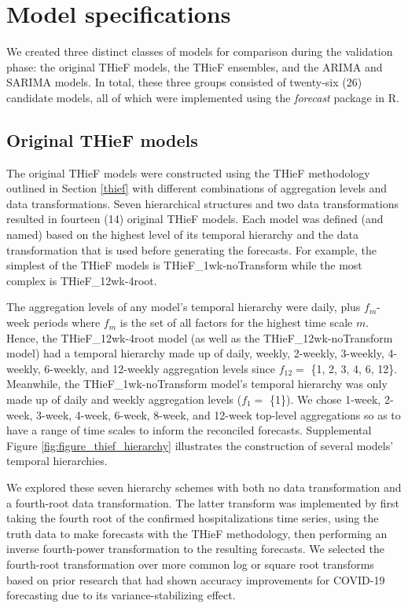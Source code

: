 \documentclass[thesis]{umassthesis}  %
\begin{document}
\section{Model specifications} \label{model_specifications}
We created three distinct classes of models for comparison during the validation phase: the original THieF models, the THieF ensembles, and the ARIMA and SARIMA models. In total, these three groups consisted of twenty-six (26) candidate models, all of which were implemented using the \textit{forecast} package in R.

\subsection{Original THieF models} \label{thief_models}
The original THieF models were constructed using the THieF methodology outlined in Section \ref{thief} with different combinations of aggregation levels and data transformations. Seven hierarchical structures and two data transformations resulted in fourteen (14) original THieF models. Each model was defined (and named) based on the highest level of its temporal hierarchy and the data transformation that is used before generating the forecasts. For example, the simplest of the THieF models is THieF\_1wk-noTransform while the most complex is THieF\_12wk-4root.

The aggregation levels of any model's temporal hierarchy were daily, plus $f_m$-week periods where $f_m$ is the set of all factors for the highest time scale $m$. Hence, the THieF\_12wk-4root model (as well as the THieF\_12wk-noTransform model) had a temporal hierarchy made up of daily, weekly, 2-weekly, 3-weekly, 4-weekly, 6-weekly, and 12-weekly aggregation levels since $f_{12}=$ \{1, 2, 3, 4, 6, 12\}. Meanwhile, the THieF\_1wk-noTransform model's temporal hierarchy was only made up of daily and weekly aggregation levels ($f_1=$ \{1\}). We chose 1-week, 2-week, 3-week, 4-week, 6-week, 8-week, and 12-week top-level aggregations so as to have a range of time scales to inform the reconciled forecasts. Supplemental Figure \ref{fig:figure_thief_hierarchy} illustrates the construction of several models' temporal hierarchies.

We explored these seven hierarchy schemes with both no data transformation and a fourth-root data transformation. The latter transform was implemented by first taking the fourth root of the confirmed hospitalizations time series, using the truth data to make forecasts with the THieF methodology, then performing an inverse fourth-power transformation to the resulting forecasts. We selected the fourth-root transformation over more common log or square root transforms based on prior research that had shown accuracy improvements for COVID-19 forecasting due to its variance-stabilizing effect\cite{4root_transform}.
\end{document}
